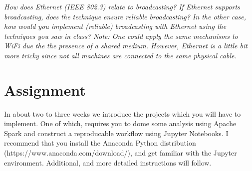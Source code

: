\emph{How does Ethernet (IEEE 802.3) relate to broadcasting? If Ethernet supports broadcasting, does the technique ensure reliable broadcasting? In the other case, how would you implement (reliable) broadcasting with Ethernet using the techniques you saw in class? Note: One could apply the same mechanisms to WiFi due the the presence of a shared medium. However, Ethernet is a little bit more tricky since not all machines are connected to the same physical cable.}

\section{Assignment}
\label{sec:assignment}

In about two to three weeks we introduce the projects which you will have to implement. One of which, requires you to dome some analysis using Apache Spark and construct a reproducable workflow using Jupyter Notebooks. I recommend that you install the Anaconda Python distribution (https://www.anaconda.com/download/), and get familiar with the Jupyter environment. Additional, and more detailed instructions will follow.


